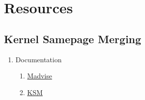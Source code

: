 \section{Resources}

\subsection{Kernel Samepage Merging}

\begin{enumerate}
\item Documentation
  \begin{enumerate}
  \item \href{http://man7.org/linux/man-pages/man2/madvise.2.html}{Madvise}
  \item \href{https://www.kernel.org/doc/Documentation/vm/ksm.txt}{KSM}
  \end{enumerate}
  
\end{enumerate}

    
    


